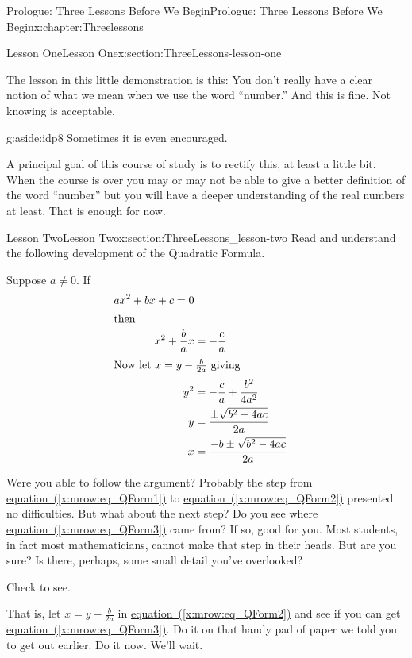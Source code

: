\documentclass[oneside,10pt,]{book}
\newcommand{\xreffont}{\relax}
\numberwithin{equation}{section}
\newcommand{\amp}{&}
\begin{document}
\begin{chapterptx}{Prologue: Three Lessons Before We Begin}{}{Prologue: Three Lessons Before We Begin}{}{}{x:chapter:Threelessons}
\begin{sectionptx}{Lesson One}{}{Lesson One}{}{}{x:section:ThreeLessons-lesson-one}
\par
The lesson in this little demonstration is this: You don't really have a clear notion of what we mean when we use the word ``number.'' And this is fine. Not knowing  is acceptable.%
\begin{aside}{}{g:aside:idp8}%
Sometimes it is even encouraged.%
\end{aside}
A principal goal of this  course of study is to rectify this, at least a little bit. When the course is over you may or may not be able to give a better definition of the word ``number'' but you will have a deeper understanding of the real numbers at least. That is enough for now.%
\end{sectionptx}
%
%
\typeout{************************************************}
\typeout{************************************************}
%
\begin{sectionptx}{Lesson Two}{}{Lesson Two}{}{}{x:section:ThreeLessons_lesson-two}
Read and understand the following development of the Quadratic Formula.%
\par
Suppose \(a\neq0\). If%
\begin{align}
ax^2+bx+c =0\label{x:mrow:eq_QForm1}\\
\intertext{then}
x^2+\frac{b}{a}x\amp =-\frac{c}{a}\label{x:mrow:eq_QForm2}\\
\intertext{Now let \(x=y-\frac{b}{2a}\) giving}
y^2\amp = -\frac{c}{a} +\frac{b^2}{4a^2}\label{x:mrow:eq_QForm3}\\
y\amp = \frac{\pm \sqrt{b^2-4ac}}{2a}\label{g:mrow:idp9}\\
x\amp = \frac{-b\pm\sqrt{b^2-4ac}}{2a}\label{x:mrow:eq_QForm4}
\end{align}
%
\par
Were you able to follow the argument? Probably the step from \hyperref[x:mrow:eq_QForm1]{equation~({\xreffont\ref{x:mrow:eq_QForm1}})} to \hyperref[x:mrow:eq_QForm2]{equation~({\xreffont\ref{x:mrow:eq_QForm2}})} presented no difficulties. But what about the next step? Do you see where \hyperref[x:mrow:eq_QForm3]{equation~({\xreffont\ref{x:mrow:eq_QForm3}})} came from? If so, good for you. Most students, in fact most mathematicians, cannot make that step in their heads. But are you sure? Is there, perhaps, some small detail you've overlooked?%
\par
Check to see.%
\par
That is, let \(x=y-\frac{b}{2a}\) in \hyperref[x:mrow:eq_QForm2]{equation~({\xreffont\ref{x:mrow:eq_QForm2}})} and see if you can get \hyperref[x:mrow:eq_QForm3]{equation~({\xreffont\ref{x:mrow:eq_QForm3}})}. Do it on that handy pad of paper we told you to get out earlier. Do it now. We'll wait.%

\end{sectionptx}
\end{chapterptx}
\end{document}
